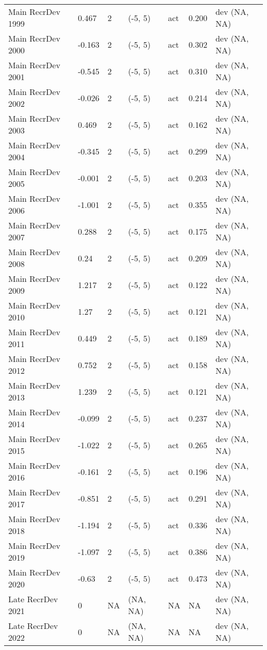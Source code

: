 \documentclass[11pt,
  english,
  letterpaper,
]{article}
\begin{document}
\begin{landscape}
\begin{longtable}[t]{>{\raggedright\arraybackslash}p{7.5cm}lllll>{\raggedright\arraybackslash}p{3.5cm}}
Main RecrDev 1999 & 0.467 & 2 & (-5, 5) & act & 0.200 & dev (NA, NA)\\
Main RecrDev 2000 & -0.163 & 2 & (-5, 5) & act & 0.302 & dev (NA, NA)\\
Main RecrDev 2001 & -0.545 & 2 & (-5, 5) & act & 0.310 & dev (NA, NA)\\
Main RecrDev 2002 & -0.026 & 2 & (-5, 5) & act & 0.214 & dev (NA, NA)\\
Main RecrDev 2003 & 0.469 & 2 & (-5, 5) & act & 0.162 & dev (NA, NA)\\
Main RecrDev 2004 & -0.345 & 2 & (-5, 5) & act & 0.299 & dev (NA, NA)\\
Main RecrDev 2005 & -0.001 & 2 & (-5, 5) & act & 0.203 & dev (NA, NA)\\
Main RecrDev 2006 & -1.001 & 2 & (-5, 5) & act & 0.355 & dev (NA, NA)\\
Main RecrDev 2007 & 0.288 & 2 & (-5, 5) & act & 0.175 & dev (NA, NA)\\
Main RecrDev 2008 & 0.24 & 2 & (-5, 5) & act & 0.209 & dev (NA, NA)\\
Main RecrDev 2009 & 1.217 & 2 & (-5, 5) & act & 0.122 & dev (NA, NA)\\
Main RecrDev 2010 & 1.27 & 2 & (-5, 5) & act & 0.121 & dev (NA, NA)\\
Main RecrDev 2011 & 0.449 & 2 & (-5, 5) & act & 0.189 & dev (NA, NA)\\
Main RecrDev 2012 & 0.752 & 2 & (-5, 5) & act & 0.158 & dev (NA, NA)\\
Main RecrDev 2013 & 1.239 & 2 & (-5, 5) & act & 0.121 & dev (NA, NA)\\
Main RecrDev 2014 & -0.099 & 2 & (-5, 5) & act & 0.237 & dev (NA, NA)\\
Main RecrDev 2015 & -1.022 & 2 & (-5, 5) & act & 0.265 & dev (NA, NA)\\
Main RecrDev 2016 & -0.161 & 2 & (-5, 5) & act & 0.196 & dev (NA, NA)\\
Main RecrDev 2017 & -0.851 & 2 & (-5, 5) & act & 0.291 & dev (NA, NA)\\
Main RecrDev 2018 & -1.194 & 2 & (-5, 5) & act & 0.336 & dev (NA, NA)\\
Main RecrDev 2019 & -1.097 & 2 & (-5, 5) & act & 0.386 & dev (NA, NA)\\
Main RecrDev 2020 & -0.63 & 2 & (-5, 5) & act & 0.473 & dev (NA, NA)\\
Late RecrDev 2021 & 0 & NA & (NA, NA) & NA & NA & dev (NA, NA)\\
Late RecrDev 2022 & 0 & NA & (NA, NA) & NA & NA & dev (NA, NA)\\

\end{longtable}
\end{landscape}
\end{document}
